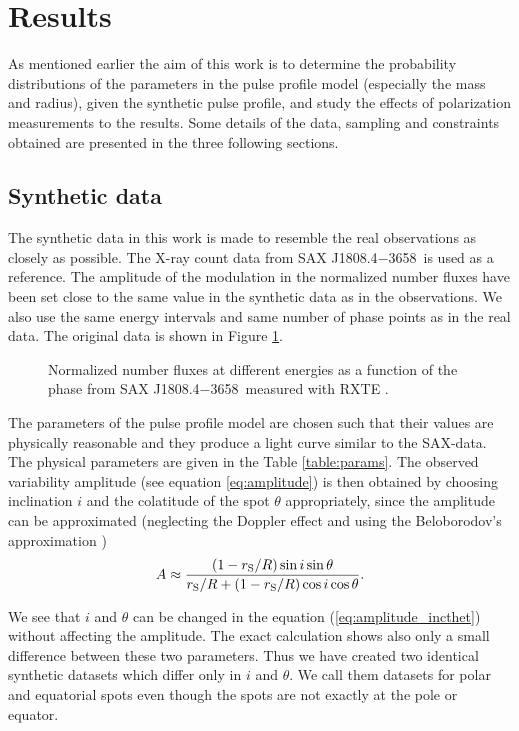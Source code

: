 \documentclass{wihuri}
\def\rg{r_{\rm S}} %
\def\be{\begin{equation}}
\def\ee{\end{equation}}
\def\rg{r_{\rm S}} %
\def\source{SAX J1808.4$-$3658}
\begin{document}
\clearpage

\section{Results}

As mentioned earlier the aim of this work is to determine the probability distributions of the parameters in the pulse profile model (especially the mass and radius), given the synthetic pulse profile, and study the effects of polarization measurements to the results. Some details of the data, sampling and constraints obtained are presented in the three following sections. 


\subsection{Synthetic data}

The synthetic data in this work is made to resemble the real observations as closely as possible. The X-ray count data from \source \ is used as a reference. The amplitude of the modulation in the normalized number fluxes have been set close to the same value in the synthetic data as in the observations. We also use the same energy intervals and same number of phase points as in the real data. The original data is shown in Figure \ref{fig:saxdata}.  

\begin{figure}
\centerline{} 
\caption{Normalized number fluxes at different energies as a function of the phase from \source \ measured with RXTE . 
\label{fig:saxdata}}
\end{figure}


The parameters of the pulse profile model are chosen such that their values are physically reasonable and they produce a light curve similar to the SAX-data. The physical parameters are given in the Table \ref{table:params}. The observed variability amplitude (see equation \ref{eq:amplitude}) is then obtained by choosing inclination $i$ and the colatitude of the spot $\theta$ appropriately, since the amplitude can be approximated (neglecting the Doppler effect and using the Beloborodov's approximation \cite{poutaviironen})
\be \label{eq:amplitude_incthet}
A \approx \frac{(1-\rg/R)\sin i \sin \theta}{\rg/R+(1-\rg/R)\cos i \cos \theta}.
\ee 

We see that $i$ and $\theta$ can be changed in the equation (\ref{eq:amplitude_incthet}) without affecting the amplitude. The exact calculation shows also only a small difference between these two parameters. Thus we have created two identical synthetic datasets which differ only in $i$ and $\theta$. We call them datasets for polar and equatorial spots even though the spots are not exactly at the pole or equator. 
\end{document}
